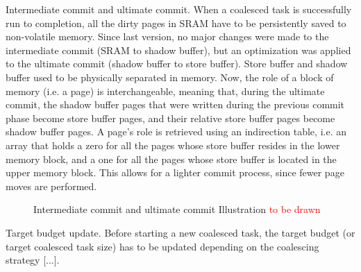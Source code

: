 Intermediate commit and ultimate commit. When a coalesced task is successfully run to completion, all the dirty pages in SRAM have to be persistently saved to non-volatile memory. Since last version, no major changes were made to the intermediate commit (SRAM to shadow buffer), but an optimization was applied to the ultimate commit (shadow buffer to store buffer). Store buffer and shadow buffer used to be physically separated in memory. Now, the role of a block of memory (i.e. a page) is interchangeable, meaning that, during the ultimate commit, the shadow buffer pages that were written during the previous commit phase become store buffer pages, and their relative store buffer pages become shadow buffer pages. A page’s role is retrieved using an indirection table, i.e. an array that holds a zero for all the pages whose store buffer resides in the lower memory block, and a one for all the pages whose store buffer is located in the upper memory block. This allows for a lighter commit process, since fewer page moves are performed.

\begin{figure}
	\caption{Intermediate commit and ultimate commit Illustration \textcolor{red}{to be drawn}}
\end{figure}

Target budget update. Before starting a new coalesced task, the target budget (or target coalesced task size) has to be updated depending on the coalescing strategy [...].